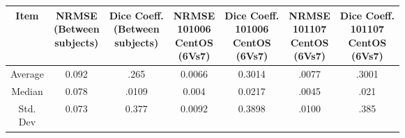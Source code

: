\hfill \break
\begin{center}
\begin{tabularx}{.99\textwidth}{|c|c|c|c|c|c|c|}
\hline
Item  & \makecell[l]{NRMSE\\(Between\\subjects)} & \makecell[l]{Dice Coeff.\\(Between\\subjects)} & \makecell[l]{NRMSE\\101006\\CentOS\\(6Vs7)} & \makecell[l]{Dice Coeff.\\ 101006\\CentOS\\(6Vs7)} & \makecell[l]{NRMSE\\101107\\CentOS\\(6Vs7)} & \makecell[l]{Dice Coeff.\\ 101107\\CentOS\\(6Vs7)} \\ \hline
Average            & 0.092        & .265      & 0.0066     & 0.3014   & .0077   & .3001     \\ \hline
Median             & 0.078    & .0109       & 0.004          & 0.0217           & .0045     & .021  \\ \hline
\makecell[l]{Std.\\Dev} & 0.073     & 0.377           & 0.0092         & 0.3898   & .0100       & .385 \\ \hline
\end{tabularx}
\label{tab:comparison_table}
\end{center}
